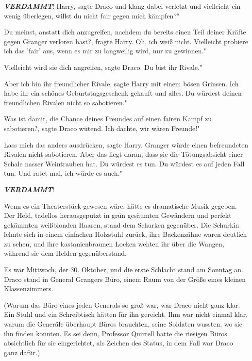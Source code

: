 \textbf{\emph{VERDAMMT}}! \glqq{}Harry\grqq{}, sagte Draco und klang dabei
verletzt und vielleicht ein wenig überlegen, \glqq{}willst du nicht fair gegen
mich kämpfen?"

\glqq{}Du meinst, anstatt dich anzugreifen, nachdem du bereits einen Teil deiner
Kräfte gegen Granger verloren hast?\grqq{}, fragte Harry. \glqq{}Oh, ich weiß
nicht. Vielleicht probiere ich das 'fair' aus, wenn es mir zu langweilig wird,
nur zu gewinnen."

\glqq{}Vielleicht wird sie dich angreifen\grqq{}, sagte Draco. \glqq{}Du bist ihr
Rivale."

\glqq{}Aber ich bin ihr freundlicher Rivale\grqq{}, sagte Harry mit einem bösen
Grinsen. \glqq{}Ich habe ihr ein schönes Geburtstagsgeschenk gekauft und alles.
Du würdest deinen freundlichen Rivalen nicht so sabotieren."

\glqq{}Was ist damit, die Chance deines Freundes auf einen fairen Kampf zu
sabotieren?\grqq{}, sagte Draco wütend. \glqq{}Ich dachte, wir wären Freunde!"

\glqq{}Lass mich das anders ausdrücken\grqq{}, sagte Harry. \glqq{}Granger würde
einen befreundeten Rivalen nicht sabotieren. Aber das liegt daran, dass sie die
Tötungsabsicht einer Schale nasser Weintrauben hat. Du würdest es tun. Du
würdest es auf jeden Fall tun. Und ratet mal, ich würde es auch."

\textbf{\emph{VERDAMMT}}!

Wenn es ein Theaterstück gewesen wäre, hätte es dramatische Musik gegeben. Der
Held, tadellos herausgeputzt in grün gesäumten Gewändern und perfekt gekämmten
weißblonden Haaren, stand dem Schurken gegenüber. Die Schurkin lehnte sich in
einem einfachen Holzstuhl zurück, ihre Backenzähne waren deutlich zu sehen, und
ihre kastanienbraunen Locken wehten ihr über die Wangen, während sie dem Helden
gegenüberstand.

Es war Mittwoch, der 30. Oktober, und die erste Schlacht stand am Sonntag an.
Draco stand in General Grangers Büro, einem Raum von der Größe eines kleinen
Klassenzimmers.

(Warum das Büro eines jeden Generals so groß war, war Draco nicht ganz klar. Ein
Stuhl und ein Schreibtisch hätten für ihn gereicht. Ihm war nicht einmal klar,
warum die Generäle überhaupt Büros brauchten, seine Soldaten wussten, wo sie ihn
finden konnten. Es sei denn, Professor Quirrell hatte die riesigen Büros
absichtlich für sie eingerichtet, als Zeichen des Status, in dem Fall war Draco
ganz dafür.)

